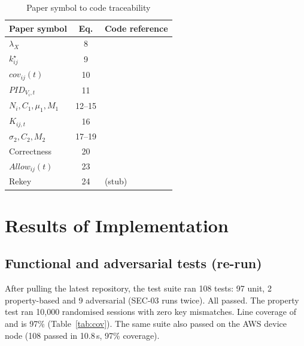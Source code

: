 \documentclass[12pt,a4paper,oneside]{report}
\numberwithin{equation}{chapter}
\begin{document}
\begin{table}[H]
\centering
\caption{Paper symbol to code traceability}
\label{tab:trace}
\small
\begin{tabularx}{\textwidth}{|P{0.22\textwidth}|c|Y|}
\hline
\textbf{Paper symbol} & \textbf{Eq.} & \textbf{Code reference}\\ \hline
$\lambda_X$ & 8 & \\ \hline
$k^\star_{ij}$ & 9 & \\ \hline
$cov_{ij}(t)$ & 10 & \\ \hline
$PID_{V_i,t}$ & 11 & \\ \hline
$N_i, C_1, \mu_1, M_1$ & 12--15 & \\ \hline
$K_{ij,t}$ & 16 & \\ \hline
$\sigma_2, C_2, M_2$ & 17--19 & \\ \hline
Correctness & 20 & \\ \hline
$Allow_{ij}(t)$ & 23 & \\ \hline
Rekey & 24 &  (stub)\\ \hline
\end{tabularx}
\end{table}

\section{Results of Implementation}
\label{sec:results}

\subsection*{Functional and adversarial tests (re-run)}
After pulling the latest repository, the test suite ran 108 tests: 97 unit, 2 property-based and 9 adversarial (SEC-03 runs twice). All passed. The property test ran 10{,}000 randomised sessions with zero key mismatches. Line coverage of  and  is 97\% (Table~\ref{tab:cov}). The same suite also passed on the AWS device node (108 passed in 10.8\,s, 97\% coverage).
\end{document}
